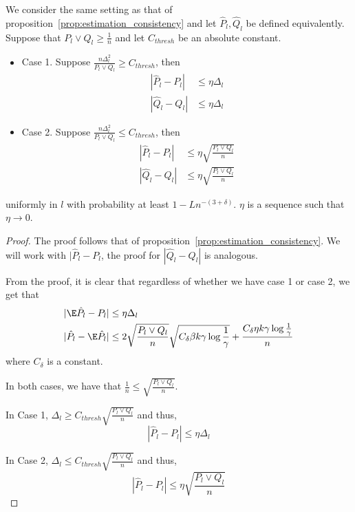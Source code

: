 \documentclass{article}
\begin{document}
\begin{proposition}
\label{prop:estimation_consistency_generalization}
We consider the same setting as that of proposition~\ref{prop:estimation_consistency} and let $\hat{P}_l, \hat{Q}_l$ be defined equivalently. Suppose that $P_l \vee Q_l \geq \frac{1}{n}$ and let $C_{thresh}$ be an absolute constant.

\begin{itemize}
\item Case 1. Suppose $\frac{n \Delta_l^2}{P_l \vee Q_l} \geq C_{thresh}$, then
\begin{align*}
 | \hat{P}_l - P_l | &\leq \eta \Delta_l \\
 | \hat{Q}_l - Q_l | &\leq \eta \Delta_l 
\end{align*}
\item Case 2. Suppose $\frac{n \Delta_l^2}{P_l \vee Q_l} \leq C_{thresh}$, then
\begin{align*}
 | \hat{P}_l - P_l | &\leq \eta \sqrt{ \frac{P_l \vee Q_l}{n}} \\
 | \hat{Q}_l - Q_l | &\leq \eta \sqrt{ \frac{P_l \vee Q_l}{n}}
\end{align*}
\end{itemize}

uniformly in $l$ with probability at least $1 - L n^{-(3 + \delta)}$. 
$\eta$ is a sequence such that $\eta \rightarrow 0$. 
\end{proposition}

\begin{proof}
The proof follows that of proposition~\ref{prop:estimation_consistency}. We will work with $|\hat{P}_l - P_l$, the proof for $|\hat{Q}_l - Q_l|$ is analogous. 

From the proof, it is clear that regardless of whether we have case 1 or case 2, we get that 
\begin{align*}
| \E \hat{P}_l - P_l | &\leq \eta \Delta_l \\
| \hat{P}_l - \E \hat{P}_l | &\leq 
   2 \sqrt{ \frac{P_l \vee Q_l}{n} } \sqrt{ C_\delta \beta k \gamma \log \frac{1}{\gamma}} + \frac{ C_\delta \eta k \gamma \log \frac{1}{\gamma}}{n}
\end{align*}
where $C_\delta$ is a constant. 

In both cases, we have that $\frac{1}{n} \leq \sqrt{ \frac{P_l \vee Q_l}{n}}$. 

In Case 1, $\Delta_l \geq C_{thresh} \sqrt{ \frac{P_l \vee Q_l}{n}} $ and thus, 
\[
| \hat{P}_l - P_l| \leq \eta \Delta_l
\]

In Case 2, $\Delta_l \leq C_{thresh} \sqrt{ \frac{P_l \vee Q_l}{n}}$ and thus,
\[
| \hat{P}_l - P_l| \leq \eta \sqrt{ \frac{P_l \vee Q_l}{n}}
\]


\end{proof}
\end{document}
